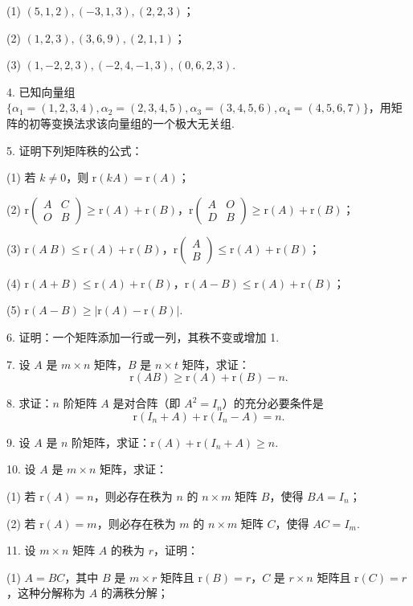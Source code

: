 \documentclass[UTF8,12pt,a4paper,fontset=fandol]{ctexart}
\begin{document}
(1) $(5,1,2),(-3,1,3),(2,2,3)$；

(2) $(1,2,3),(3,6,9),(2,1,1)$；

(3) $(1,-2,2,3),(-2,4,-1,3),(0,6,2,3)$.

4. 已知向量组 $\{\alpha_1=(1,2,3,4),\alpha_2=(2,3,4,5),\alpha_3=(3,4,5,6),\alpha_4=(4,5,6,7)\}$，用矩阵的初等变换法求该向量组的一个极大无关组.

5. 证明下列矩阵秩的公式：

(1) 若 $k\neq 0$，则 $\mathrm{r}(kA)=\mathrm{r}(A)$；

(2) $\mathrm{r}\left(\begin{array}{cc}A&C\\O&B\end{array}\right)\geq \mathrm{r}(A)+\mathrm{r}(B)$，$\mathrm{r}\left(\begin{array}{cc}A&O\\D&B\end{array}\right)\geq \mathrm{r}(A)+\mathrm{r}(B)$；

(3) $\mathrm{r}(A\ B)\leq \mathrm{r}(A)+\mathrm{r}(B)$，$\mathrm{r}\left(\begin{array}{c}A\\B\end{array}\right)\leq \mathrm{r}(A)+\mathrm{r}(B)$；

(4) $\mathrm{r}(A+B)\leq \mathrm{r}(A)+\mathrm{r}(B)$，$\mathrm{r}(A-B)\leq \mathrm{r}(A)+\mathrm{r}(B)$；

(5) $\mathrm{r}(A-B)\geq |\mathrm{r}(A)-\mathrm{r}(B)|$.

6. 证明：一个矩阵添加一行或一列，其秩不变或增加 1.

7. 设 $A$ 是 $m\times n$ 矩阵，$B$ 是 $n\times t$ 矩阵，求证：
\[
\mathrm{r}(AB)\geq \mathrm{r}(A)+\mathrm{r}(B)-n.
\]

8. 求证：$n$ 阶矩阵 $A$ 是对合阵（即 $A^2=I_n$）的充分必要条件是
\[
\mathrm{r}(I_n+A)+\mathrm{r}(I_n-A)=n.
\]

9. 设 $A$ 是 $n$ 阶矩阵，求证：$\mathrm{r}(A)+\mathrm{r}(I_n+A)\geq n$.

10. 设 $A$ 是 $m\times n$ 矩阵，求证：

(1) 若 $\mathrm{r}(A)=n$，则必存在秩为 $n$ 的 $n\times m$ 矩阵 $B$，使得 $BA=I_n$；

(2) 若 $\mathrm{r}(A)=m$，则必存在秩为 $m$ 的 $n\times m$ 矩阵 $C$，使得 $AC=I_m$.

11. 设 $m\times n$ 矩阵 $A$ 的秩为 $r$，证明：

(1) $A=BC$，其中 $B$ 是 $m\times r$ 矩阵且 $\mathrm{r}(B)=r$，$C$ 是 $r\times n$ 矩阵且 $\mathrm{r}(C)=r$，这种分解称为 $A$ 的满秩分解；
\end{document}
